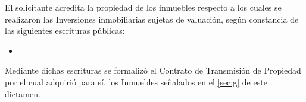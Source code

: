 El solicitante \empresaCorto{} acredita la propiedad de los inmuebles respecto a los cuales se realizaron las Inversiones inmobiliarias sujetas de valuaci\'on, seg\'un constancia de las siguientes escrituras p\'ublicas:

\begin{itemize}
\item 

\end{itemize}

Mediante dichas escrituras se formaliz\'o el Contrato de Transmisi\'on de Propiedad por el cual \textcolor{principal}{\empresaSolicitante} adquiri\'o para s\'i, los Inmuebles se\~nalados en el  \autoref{sec:g} de este dictamen.
